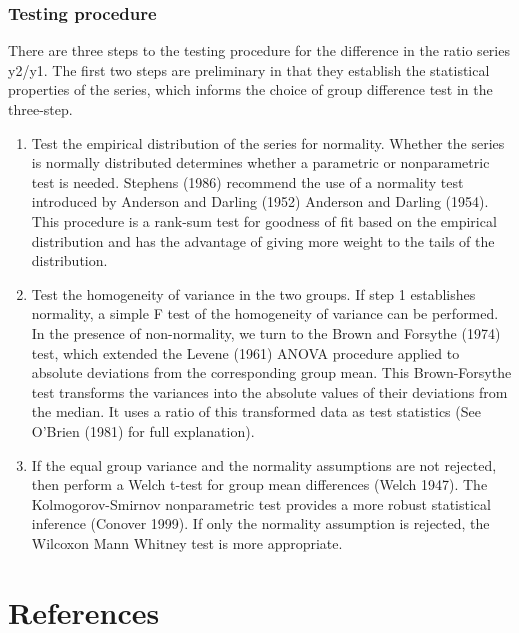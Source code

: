 \documentclass[
  letterpaper,
  DIV=11,
  numbers=noendperiod]{scrartcl}
\begin{document}
\hypertarget{testing-procedure}{%
\subsubsection{Testing procedure}\label{testing-procedure}}

There are three steps to the testing procedure for the difference in the
ratio series y2/y1. The first two steps are preliminary in that they
establish the statistical properties of the series, which informs the
choice of group difference test in the three-step.

\begin{enumerate}
\def\labelenumi{\arabic{enumi}.}
\item
  Test the empirical distribution of the series for normality. Whether
  the series is normally distributed determines whether a parametric or
  nonparametric test is needed. Stephens (1986) recommend the use of a
  normality test introduced by Anderson and Darling (1952) Anderson and
  Darling (1954). This procedure is a rank-sum test for goodness of fit
  based on the empirical distribution and has the advantage of giving
  more weight to the tails of the distribution.
\item
  Test the homogeneity of variance in the two groups. If step 1
  establishes normality, a simple F test of the homogeneity of variance
  can be performed. In the presence of non-normality, we turn to the
  Brown and Forsythe (1974) test, which extended the Levene (1961) ANOVA
  procedure applied to absolute deviations from the corresponding group
  mean. This Brown-Forsythe test transforms the variances into the
  absolute values of their deviations from the median. It uses a ratio
  of this transformed data as test statistics (See O'Brien (1981) for
  full explanation).
\item
  If the equal group variance and the normality assumptions are not
  rejected, then perform a Welch t-test for group mean differences
  (Welch 1947). The Kolmogorov-Smirnov nonparametric test provides a
  more robust statistical inference (Conover 1999). If only the
  normality assumption is rejected, the Wilcoxon Mann Whitney test is
  more appropriate.
\end{enumerate}

\hypertarget{references}{%
\section*{References}\label{references}}
\end{document}
